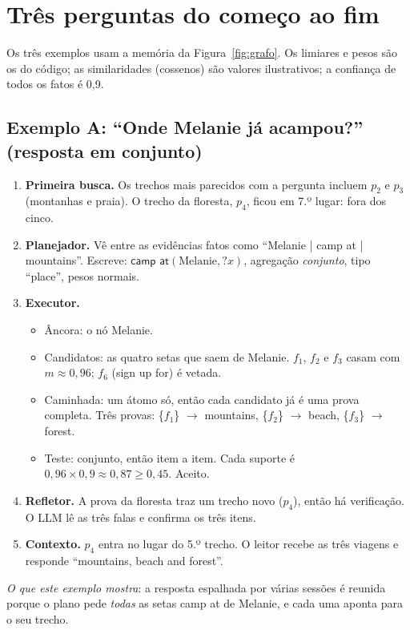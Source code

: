 \documentclass[11pt]{article}
\newcommand{\rel}[1]{\textsf{#1}}
\newcommand{\V}[1]{\mathord{?}\mathit{#1}}
\begin{document}
\section{Três perguntas do começo ao fim}
\label{sec:exemplos}

Os três exemplos usam a memória da Figura~\ref{fig:grafo}. Os limiares e pesos
são os do código; as similaridades (cossenos) são valores ilustrativos; a
confiança de todos os fatos é 0,9.

\subsection*{Exemplo A: ``Onde Melanie já acampou?'' (resposta em conjunto)}

\begin{enumerate}
\item \textbf{Primeira busca.} Os trechos mais parecidos com a pergunta
  incluem $p_2$ e $p_3$ (montanhas e praia). O trecho da floresta, $p_4$,
  ficou em 7.º lugar: fora dos cinco.
\item \textbf{Planejador.} Vê entre as evidências fatos como
  ``Melanie | camp at | mountains''. Escreve:
  $\rel{camp at}(\text{Melanie},\V x)$, agregação \emph{conjunto}, tipo
  ``place'', pesos normais.
\item \textbf{Executor.}
  \begin{itemize}
  \item Âncora: o nó Melanie.
  \item Candidatos: as quatro setas que saem de Melanie. $f_1$, $f_2$ e $f_3$
    casam com $m\approx0{,}96$; $f_6$ (\rel{sign up for}) é vetada.
  \item Caminhada: um átomo só, então cada candidato já é uma prova completa.
    Três provas: \{$f_1$\} $\to$ mountains, \{$f_2$\} $\to$ beach,
    \{$f_3$\} $\to$ forest.
  \item Teste: conjunto, então item a item. Cada suporte é
    $0{,}96\times0{,}9\approx0{,}87\ge0{,}45$. Aceito.
  \end{itemize}
\item \textbf{Refletor.} A prova da floresta traz um trecho novo ($p_4$),
  então há verificação. O LLM lê as três falas e confirma os três itens.
\item \textbf{Contexto.} $p_4$ entra no lugar do 5.º trecho. O leitor recebe as
  três viagens e responde ``mountains, beach and forest''.
\end{enumerate}
\emph{O que este exemplo mostra}: a resposta espalhada por várias sessões é
reunida porque o plano pede \emph{todas} as setas \rel{camp at} de Melanie, e
cada uma aponta para o seu trecho.
\end{document}
